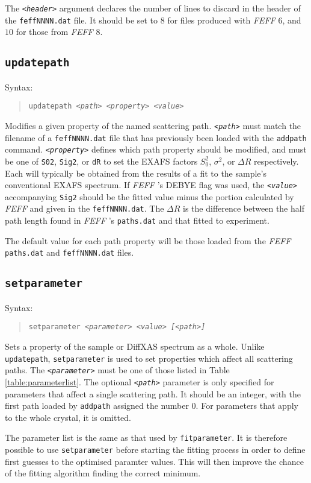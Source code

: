 \documentclass[a4paper,12pt]{report}
\newcommand{\feff}{\emph{FEFF} }
\begin{document}
The \texttt{\emph{<header>}} argument declares the number of lines to discard in the header of the \verb|feffNNNN.dat| file. It should be set to $8$ for files produced with \feff 6, and $10$ for those from \feff 8.

\subsection{\texttt{updatepath}}
Syntax:
\begin{quote}
  \texttt{updatepath \emph{<path> <property> <value>}}
\end{quote}
Modifies a given property of the named scattering path. \emph{\texttt{<path>}} must match the filename of a \verb|feffNNNN.dat| file that has previously been loaded with the \verb|addpath| command. \emph{\texttt{<property>}} defines which path property should be modified, and must be one of \verb|S02|, \verb|Sig2|, or \verb|dR| to set the EXAFS factors $S_0^2$, $\sigma^2$, or $\Delta R$ respectively. Each will typically be obtained from the results of a fit to the sample's conventional EXAFS spectrum. If \feff's DEBYE flag was used, the \emph{\texttt{<value>}} accompanying \verb|Sig2| should be the fitted value minus the portion calculated by \feff and given in the \verb|feffNNNN.dat|. The $\Delta R$ is the difference between the half path length found in \feff's \verb|paths.dat| and that fitted to experiment.

The default value for each path property will be those loaded from the \feff \verb|paths.dat| and \verb|feffNNNN.dat| files.

\subsection{\texttt{setparameter}}
Syntax:
\begin{quote}
  \texttt{setparameter \emph{<parameter> <value> [<path>]}}
\end{quote}
Sets a property of the sample or DiffXAS spectrum as a whole. Unlike \verb|updatepath|, \verb|setparameter| is used to set properties which affect all scattering paths. The  \emph{\texttt{<parameter>}} must be one of those listed in Table \ref{table:parameterlist}. The optional \emph{\texttt{<path>}} parameter is only specified for parameters that affect a single scattering path. It should be an integer, with the first path loaded by \verb|addpath| assigned the number 0. For parameters that apply to the whole crystal, it is omitted.

The parameter list is the same as that used by \verb|fitparameter|. It is therefore possible to use \verb|setparameter| before starting the fitting process in order to define first guesses to the optimised paramter values. This will then improve the chance of the fitting algorithm finding the correct minimum.
\end{document}
